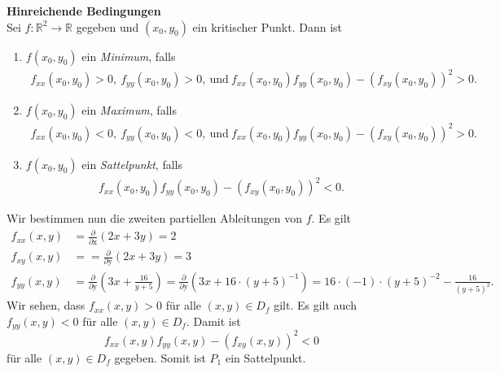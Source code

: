\textbf{Hinreichende Bedingungen}\\
Sei $f : \mathbb{R}^2 \to \mathbb{R}$ gegeben und $(x_0,y_0) $ ein kritischer Punkt.
Dann ist
\renewcommand{\labelenumi}{\theenumi.}
\begin{enumerate}
\item
{}
$f(x_0,y_0)$ ein \textit{Minimum}, falls
\begin{align*}
f_{xx}(x_0,y_0) > 0, \ f_{yy}(x_0,y_0) > 0, \ \text{und} \ f_{xx}(x_0,y_0)f_{yy}(x_0,y_0) - (f_{xy}(x_0,y_0))^2  > 0.
\end{align*}

\item
{}
$f(x_0,y_0)$ ein \textit{Maximum}, falls
\begin{align*}
f_{xx}(x_0,y_0) < 0, \ f_{yy}(x_0,y_0) < 0, \ \text{und} \ f_{xx}(x_0,y_0)f_{yy}(x_0,y_0) - (f_{xy}(x_0,y_0))^2  > 0.
\end{align*}

\item
{}
$f(x_0,y_0)$ ein \textit{Sattelpunkt}, falls
\begin{align*}
f_{xx}(x_0,y_0)f_{yy}(x_0,y_0) - (f_{xy}(x_0,y_0))^2  < 0.
\end{align*}
\end{enumerate}

Wir bestimmen nun die zweiten partiellen Ableitungen von $f$.
Es gilt
\begin{equation*}
\begin{split}
f_{xx}(x,y)  &= 
\frac{\partial}{\partial \mathrm{x}} (2x + 3y) = 2
 \\
f_{xy}(x,y)  &=
= \frac{\partial}{\partial \mathrm{y}} (2x + 3y) 
= 3 \\
f_{yy}(x,y) &= 
\frac{\partial}{\partial \mathrm{y}} \left(3x + \frac{16}{y+5} \right)
=
\frac{\partial}{\partial \mathrm{y}} \left(3x + 16 \cdot (y+5)^{-1} \right)
= 16 \cdot (-1)\cdot(y+5)^{-2}
- \frac{16}{(y+5)^2}.
\end{split}
\end{equation*}
Wir sehen, dass $f_{xx}(x,y) > 0$ für alle $(x,y) \in D_f$ gilt. 
Es gilt auch $f_{yy}(x,y) < 0 $ für alle $(x,y) \in D_f$.
Damit ist 
\begin{equation*}
f_{xx}(x,y) f_{yy} (x,y) - (f_{xy}(x,y))^2 < 0
\end{equation*}
für alle $(x,y) \in D_f$ gegeben.
Somit ist $P_1 $ ein Sattelpunkt.

\newpage
